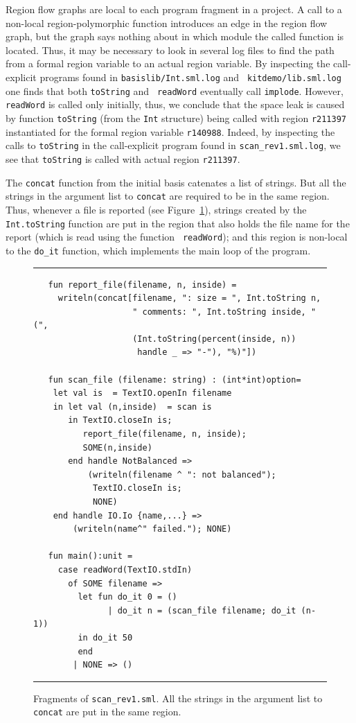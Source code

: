 \documentclass[12pt]{book}
\begin{document}
Region flow graphs are local to each program fragment in a project. A
call to a non-local region-polymorphic function introduces an edge in
the region flow graph, but the graph says nothing about in which
module the called function is located. Thus, it may be necessary to
look in several log files to find the path from a formal region
variable to an actual region variable. By inspecting the call-explicit
programs found in {\tt basislib/Int.sml.log} and {\tt
  kitdemo/lib.sml.log} one finds that both {\tt toString} and {\tt
  readWord} eventually call {\tt implode}. However, {\tt readWord} is
called only initially, thus, we conclude that the space leak is caused
by function {\tt toString} (from the {\tt Int} structure) being called
with region {\tt r211397} instantiated for the formal region variable
{\tt r140988}. Indeed, by inspecting the calls to {\tt toString} in the
call-explicit program found in {\tt scan\_rev1.sml.log}, we see that
{\tt toString} is called with actual region {\tt r211397}.

The {\tt concat} function from the initial basis catenates a list of
strings. But all the strings in the argument list to {\tt concat} are
required to be in the same region. Thus, whenever a file is reported
(see Figure~\ref{report_file.fig}), strings created by the {\tt
  Int.toString} function are put in the region that also holds the
file name for the report (which is read using the function {\tt
  readWord}); and this region is non-local to the {\tt do\_it}
function, which implements the main loop of the program.
\begin{figure}
\hrule \medskip
\begin{verbatim}
   fun report_file(filename, n, inside) = 
     writeln(concat[filename, ": size = ", Int.toString n, 
                    " comments: ", Int.toString inside, " (",
                    (Int.toString(percent(inside, n)) 
                     handle _ => "-"), "%)"])

   fun scan_file (filename: string) : (int*int)option=
    let val is  = TextIO.openIn filename 
    in let val (n,inside)  = scan is
       in TextIO.closeIn is; 
          report_file(filename, n, inside);
          SOME(n,inside)
       end handle NotBalanced => 
           (writeln(filename ^ ": not balanced");
            TextIO.closeIn is;
            NONE)
    end handle IO.Io {name,...} => 
        (writeln(name^" failed."); NONE)

   fun main():unit =
     case readWord(TextIO.stdIn)
       of SOME filename =>
         let fun do_it 0 = ()
               | do_it n = (scan_file filename; do_it (n-1))
         in do_it 50
         end
        | NONE => ()
\end{verbatim}
\caption{Fragments of {\tt scan\_rev1.sml}. All the strings in the 
  argument list to {\tt concat} are put in the same region.}
\label{report_file.fig}
\medskip \hrule
\end{figure}
\end{document}
